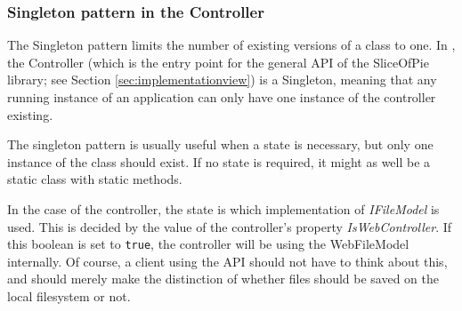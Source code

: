 \subsubsection{Singleton pattern in the Controller}

The Singleton pattern limits the number of existing versions of a class to one. In \SOP{},
the Controller (which is the entry point for the general API of the SliceOfPie library; see
Section \ref{sec:implementationview}) is a Singleton, meaning that any running instance of
an application can only have one instance of the controller existing.

The singleton pattern is usually useful when a state is necessary, but only one instance of the
class should exist. If no state is required, it might as well be a static class with static
methods.

In the case of the controller, the state is which implementation of \emph{IFileModel} is used.
This is decided by the value of the controller's property \emph{IsWebController}. If this boolean
is set to \verb|true|, the controller will be using the WebFileModel internally. Of course, a
client using the API should not have to think about this, and should merely make the distinction
of whether files should be saved on the local filesystem or not.
